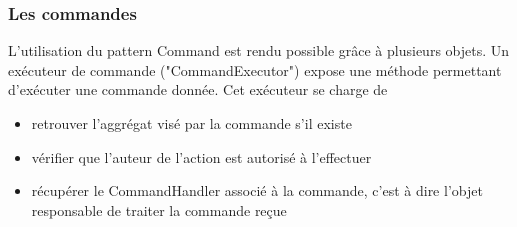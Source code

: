 \subsubsection{Les commandes}
\label{subs:Les commandes}
L'utilisation du pattern Command est rendu possible grâce à plusieurs objets.
Un exécuteur de commande ("CommandExecutor") expose une méthode permettant d'exécuter une commande donnée.
Cet exécuteur se charge de
\begin{itemize}
  \item retrouver l'aggrégat visé par la commande s'il existe
  \item vérifier que l'auteur de l'action est autorisé à l'effectuer
  \item récupérer le CommandHandler associé à la commande, c'est à dire l'objet responsable de traiter la commande reçue
\end{itemize}


